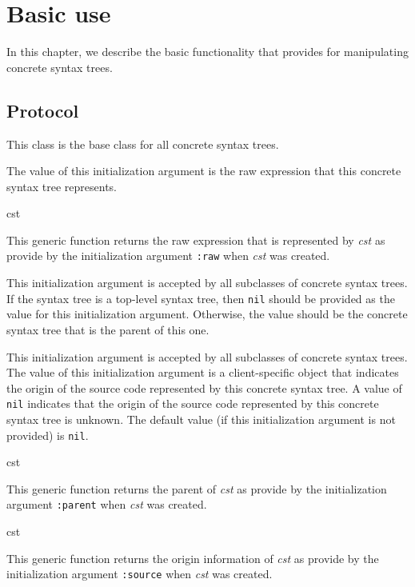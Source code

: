 \chapter{Basic use}

In this chapter, we describe the basic functionality that \sysname{}
provides for manipulating concrete syntax trees.

\section{Protocol}


This class is the base class for all concrete syntax trees.


The value of this initialization argument is the raw \commonlisp{}
expression that this concrete syntax tree represents.

 {cst}

This generic function returns the raw \commonlisp{} expression that is
represented by \textit{cst} as provide by the
initialization argument \texttt{:raw} when \textit{cst} was
created.


This initialization argument is accepted by all subclasses of concrete
syntax trees.  If the syntax tree is a top-level syntax tree, then
\texttt{nil} should be provided as the value for this initialization
argument.  Otherwise, the value should be the concrete syntax tree
that is the parent of this one.


This initialization argument is accepted by all subclasses of concrete
syntax trees.  The value of this initialization argument is a
client-specific object that indicates the origin of the source code
represented by this concrete syntax tree.  A value of \texttt{nil}
indicates that the origin of the source code represented by this concrete
syntax tree is unknown.  The default value (if this initialization
argument is not provided) is \texttt{nil}.

 {cst}

This generic function returns the parent of \textit{cst} as provide by
the initialization argument \texttt{:parent} when \textit{cst} was
created.

 {cst}

This generic function returns the origin information of \textit{cst}
as provide by the initialization argument \texttt{:source} when
\textit{cst} was created.

